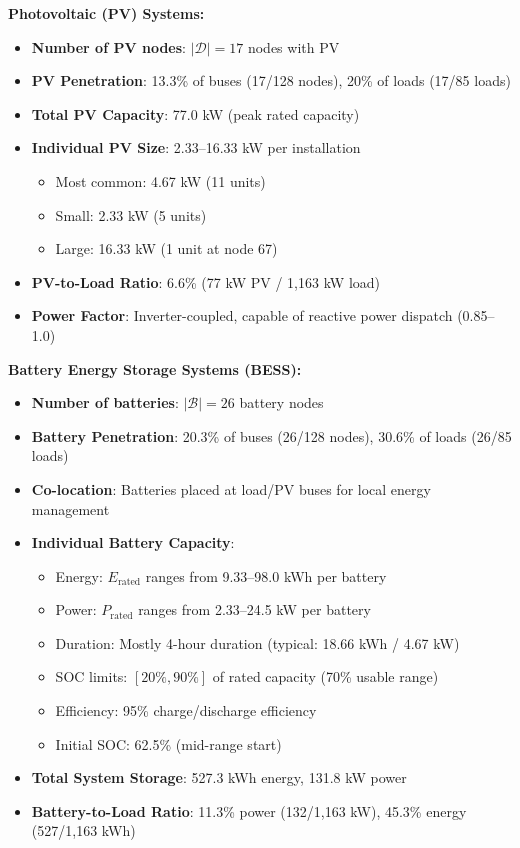 \documentclass[11pt]{article}
\begin{document}
\textbf{Photovoltaic (PV) Systems:}
\begin{itemize}
    \item \textbf{Number of PV nodes}: $|\mathcal{D}| = 17$ nodes with PV
    \item \textbf{PV Penetration}: 13.3\% of buses (17/128 nodes), 20\% of loads (17/85 loads)
    \item \textbf{Total PV Capacity}: 77.0 kW (peak rated capacity)
    \item \textbf{Individual PV Size}: 2.33--16.33 kW per installation
    \begin{itemize}
        \item Most common: 4.67 kW (11 units)
        \item Small: 2.33 kW (5 units)
        \item Large: 16.33 kW (1 unit at node 67)
    \end{itemize}
    \item \textbf{PV-to-Load Ratio}: 6.6\% (77 kW PV / 1,163 kW load)
    \item \textbf{Power Factor}: Inverter-coupled, capable of reactive power dispatch (0.85--1.0)
\end{itemize}

\textbf{Battery Energy Storage Systems (BESS):}
\begin{itemize}
    \item \textbf{Number of batteries}: $|\mathcal{B}| = 26$ battery nodes
    \item \textbf{Battery Penetration}: 20.3\% of buses (26/128 nodes), 30.6\% of loads (26/85 loads)
    \item \textbf{Co-location}: Batteries placed at load/PV buses for local energy management
    \item \textbf{Individual Battery Capacity}:
    \begin{itemize}
        \item Energy: $E_{\text{rated}}$ ranges from 9.33--98.0 kWh per battery
        \item Power: $P_{\text{rated}}$ ranges from 2.33--24.5 kW per battery
        \item Duration: Mostly 4-hour duration (typical: 18.66 kWh / 4.67 kW)
        \item SOC limits: $[20\%, 90\%]$ of rated capacity (70\% usable range)
        \item Efficiency: 95\% charge/discharge efficiency
        \item Initial SOC: 62.5\% (mid-range start)
    \end{itemize}
    \item \textbf{Total System Storage}: 527.3 kWh energy, 131.8 kW power
    \item \textbf{Battery-to-Load Ratio}: 11.3\% power (132/1,163 kW), 45.3\% energy (527/1,163 kWh)
\end{itemize}
\end{document}
